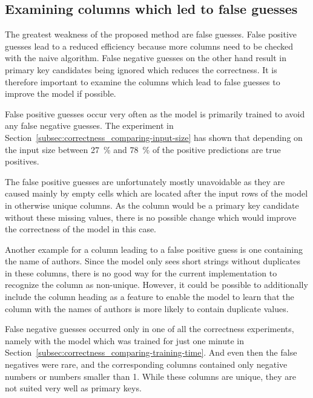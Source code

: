 \subsection{Examining columns which led to false guesses}\label{subsec:correctness_examine-false-guesses}
The greatest weakness of the proposed method are false guesses. False positive guesses lead to a reduced efficiency because more columns need to be checked with the naive algorithm. False negative guesses on the other hand result in primary key candidates being ignored which reduces the correctness. It is therefore important to examine the columns which lead to false guesses to improve the model if possible.

False positive guesses occur very often as the model is primarily trained to avoid any false negative guesses. The experiment in Section~\ref{subsec:correctness_comparing-input-size} has shown that depending on the input size between \SI{27}{\percent} and \SI{78}{\percent} of the positive predictions are true positives.

The false positive guesses are unfortunately mostly unavoidable as they are caused mainly by empty cells which are located after the input rows of the model in otherwise unique columns. As the column would be a primary key candidate without these missing values, there is no possible change which would improve the correctness of the model in this case.

Another example for a column leading to a false positive guess is one containing the name of authors. Since the model only sees short strings without duplicates in these columns, there is no good way for the current implementation to recognize the column as non-unique. However, it could be possible to additionally include the column heading as a feature to enable the model to learn that the column with the names of authors is more likely to contain duplicate values.

False negative guesses occurred only in one of all the correctness experiments, namely with the model which was trained for just one minute in Section~\ref{subsec:correctness_comparing-training-time}. And even then the false negatives were rare, and the corresponding columns contained only negative numbers or numbers smaller than 1. While these columns are unique, they are not suited very well as primary keys.
